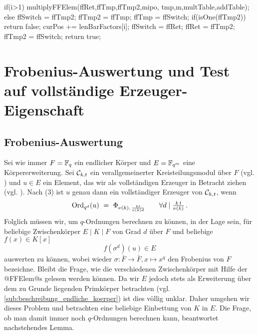 \begin{ccode}[caption={Aus \url{../Sage/enumeratePCNs.c}},
  label=lst:isPrimitive]
{{        if(i>1){
            multiplyFFElem(ffRet,ffTmp,ffTmp2,mipo,
                    tmp,m,multTable,addTable);
        }else{
            ffSwitch = ffTmp2; ffTmp2 = ffTmp; ffTmp = ffSwitch;
        }
        if(isOne(ffTmp2)) return false;
        curPos += lenBarFactors[i];
        ffSwitch = ffRet; ffRet = ffTmp2; ffTmp2 = ffSwitch;
    }
    return true;
}
\end{ccode}

\section{Frobenius-Auswertung und Test auf vollständige
  Erzeuger-Eigenschaft}

\subsection{Frobenius-Auswertung}

Sei wie immer $F = \mathbb{F}_q$ ein endlicher Körper und $E = \mathbb{F}_{q^m}$ eine
Körpererweiterung. Sei $\mathcal{C}_{k,t}$ ein verallgemeinerter
Kreisteilungsmodul über $F$ (vgl.
) und 
$u\in E$ ein Element, das wir als vollständigen Erzeuger 
in Betracht ziehen (vgl. ). Nach 
 (3) ist $u$ genau dann ein vollständiger 
Erzeuger von $\mathcal{C}_{k,t}$, wenn
\[ \operatorname{Ord}_{q^d}(u) \ =\  \Phi_{\nu(k),\, \frac{kt}{\nu(k)d}} \qquad
  \forall d \mid \tfrac{k\,t}{\nu(k)}\,.\]
Folglich müssen wir, um $q$-Ordnungen berechnen zu können, in der Lage sein,
für beliebige Zwischenkörper $E\mid K\mid F$ von Grad $d$ über $F$ und beliebige 
$f(x) \in K[x]$ 
\[ f(\sigma^d)(u) \in E\]
auswerten zu können, wobei wieder $\sigma: \bar F\to \bar F, x \mapsto x^q$ den
Frobenius von $F$ bezeichne. Bleibt die Frage, wie die verschiedenen
Zwischenkörper mit Hilfe der @FFElem@s gelesen werden können. Da wir $E$ jedoch
stets als Erweiterung über dem zu Grunde liegenden Primkörper betrachten 
(vgl. \autoref{sub:beschreibung_endliche_koerper}) ist dies völlig unklar.
Daher umgehen wir dieses Problem und betrachten eine beliebige Einbettung von
$K$ in $E$. Die Frage, ob man damit immer noch $q$-Ordnungen berechnen kann,
beantwortet nachstehendes Lemma.

